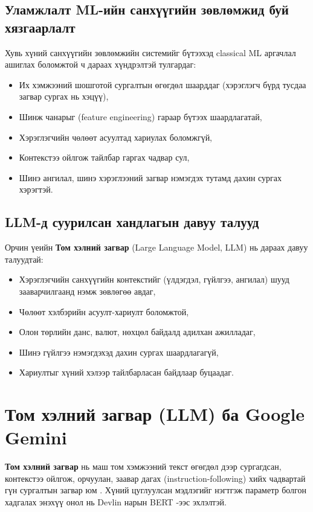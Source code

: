 \subsection{Уламжлалт ML-ийн санхүүгийн зөвлөмжид буй хязгаарлалт}
Хувь хүний санхүүгийн зөвлөмжийн системийг бүтээхэд classical ML аргачлал ашиглах боломжтой ч дараах хүндрэлтэй тулгардаг:
\begin{itemize}
    \item Их хэмжээний шошготой сургалтын өгөгдөл шаарддаг (хэрэглэгч бүрд тусдаа загвар сургах нь хэцүү),
    \item Шинж чанарыг (feature engineering) гараар бүтээх шаардлагатай,
    \item Хэрэглэгчийн чөлөөт асуултад хариулах боломжгүй,
    \item Контекстээ ойлгож тайлбар гаргах чадвар сул,
    \item Шинэ ангилал, шинэ хэрэглээний загвар нэмэгдэх тутамд дахин сургах хэрэгтэй.
\end{itemize}

\subsection{LLM-д суурилсан хандлагын давуу талууд}
Орчин үеийн \textbf{Том хэлний загвар} (Large Language Model, LLM) нь дараах давуу талуудтай:
\begin{itemize}
    \item Хэрэглэгчийн санхүүгийн контекстийг (үлдэгдэл, гүйлгээ, ангилал) шууд зааварчилгаанд нэмж зөвлөгөө авдаг,
    \item Чөлөөт хэлбэрийн асуулт-хариулт боломжтой,
    \item Олон төрлийн данс, валют, нөхцөл байдалд адилхан ажилладаг,
    \item Шинэ гүйлгээ нэмэгдэхэд дахин сургах шаардлагагүй,
    \item Хариултыг хүний хэлээр тайлбарласан байдлаар буцаадаг.
\end{itemize}

\section{Том хэлний загвар (LLM) ба Google Gemini}
\textbf{Том хэлний загвар} нь маш том хэмжээний текст өгөгдөл дээр сургагдсан, контекстээ ойлгож, орчуулан, заавар дагах (instruction-following) хийх чадвартай гүн сургалтын загвар юм \cite{gpt3, instructgpt}. Хүний цуглуулсан мэдлэгийг нэгтгэж параметр болгон хадгалах энэхүү онол нь Devlin нарын BERT \cite{bert}-ээс эхлэлтэй.\\

